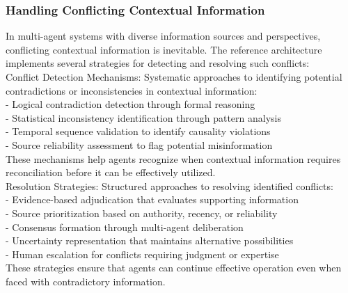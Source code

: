 \subsubsection{Handling Conflicting Contextual Information}
In multi-agent systems with diverse information sources and perspectives, conflicting contextual information is inevitable. The reference architecture implements several strategies for detecting and resolving such conflicts:\\ \newline
Conflict Detection Mechanisms: Systematic approaches to identifying potential contradictions or inconsistencies in contextual information:\\ \newline
- Logical contradiction detection through formal reasoning\\ \newline
- Statistical inconsistency identification through pattern analysis\\ \newline
- Temporal sequence validation to identify causality violations\\ \newline
- Source reliability assessment to flag potential misinformation\\ \newline
These mechanisms help agents recognize when contextual information requires reconciliation before it can be effectively utilized.\\ \newline
Resolution Strategies: Structured approaches to resolving identified conflicts:\\ \newline
- Evidence-based adjudication that evaluates supporting information\\ \newline
- Source prioritization based on authority, recency, or reliability\\ \newline
- Consensus formation through multi-agent deliberation\\ \newline
- Uncertainty representation that maintains alternative possibilities\\ \newline
- Human escalation for conflicts requiring judgment or expertise\\ \newline
These strategies ensure that agents can continue effective operation even when faced with contradictory information.\\ \newline
